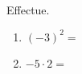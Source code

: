 %
%
    Effectue.
    \begin{enumerate}[cols=2]
        \item \((-3)^2 =\)
        \item \(-5 \cdot 2 = \)
    \end{enumerate}
